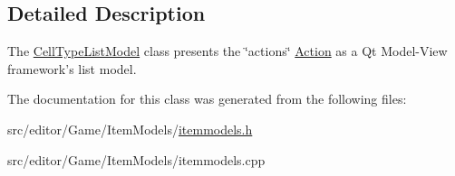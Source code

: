 \subsection{\-Detailed \-Description}
\-The \hyperlink{class_cell_type_list_model}{\-Cell\-Type\-List\-Model} class presents the \char`\"{}actions\char`\"{} \hyperlink{class_action}{\-Action} as a \-Qt \-Model-\/\-View framework's list model. 

\-The documentation for this class was generated from the following files\-:\begin{DoxyCompactItemize}
\item 
src/editor/\-Game/\-Item\-Models/\hyperlink{itemmodels_8h}{itemmodels.\-h}\item 
src/editor/\-Game/\-Item\-Models/itemmodels.\-cpp\end{DoxyCompactItemize}
